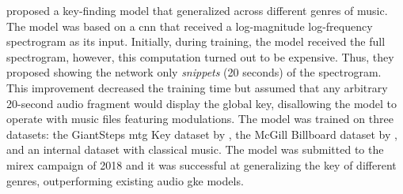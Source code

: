 



\textcite{korzeniowski2018genreagnostic} proposed a
key-finding model that generalized across different genres
of music. The model was based on a \gls{cnn} that received a
log-magnitude log-frequency spectrogram as its input.
Initially, during training, the model received the full
spectrogram, however, this computation turned out to be
expensive. Thus, they proposed showing the network only
\emph{snippets} (20 seconds) of the spectrogram. This
improvement decreased the training time but assumed that any
arbitrary 20-second audio fragment would display the global
key, disallowing the model to operate with music files
featuring modulations. The model was trained on three
datasets: the GiantSteps \gls{mtg} Key dataset by
\textcite{faraldo2016key}, the McGill Billboard dataset by
\textcite{burgoyne2011expert}, and an internal dataset with
classical music. The model was submitted to the \gls{mirex}
campaign of 2018 and it was successful at generalizing the
key of different genres, outperforming existing audio
\gls{gke} models.


